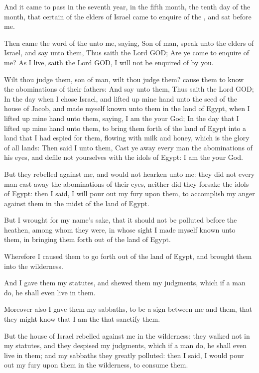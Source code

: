 \Chapter
\Verse And it came to pass in the seventh year, in the fifth month, the tenth day of the month, that certain of the elders of Israel came to enquire of the \LORD, and sat before me.

\Verse Then came the word of the \LORD unto me, saying, \Verse Son of man, speak unto the elders of Israel, and say unto them, Thus saith the Lord GOD; Are ye come to enquire of me? As I live, saith the Lord GOD, I will not be enquired of by you.

\Verse Wilt thou judge them, son of man, wilt thou judge them? cause them to know the abominations of their fathers: \Verse And say unto them, Thus saith the Lord GOD; In the day when I chose Israel, and lifted up mine hand unto the seed of the house of Jacob, and made myself known unto them in the land of Egypt, when I lifted up mine hand unto them, saying, I am the \LORD your God; \Verse In the day that I lifted up mine hand unto them, to bring them forth of the land of Egypt into a land that I had espied for them, flowing with milk and honey, which is the glory of all lands: \Verse Then said I unto them, Cast ye away every man the abominations of his eyes, and defile not yourselves with the idols of Egypt: I am the \LORD your God.

\Verse But they rebelled against me, and would not hearken unto me: they did not every man cast away the abominations of their eyes, neither did they forsake the idols of Egypt: then I said, I will pour out my fury upon them, to accomplish my anger against them in the midst of the land of Egypt.

\Verse But I wrought for my name's sake, that it should not be polluted before the heathen, among whom they were, in whose sight I made myself known unto them, in bringing them forth out of the land of Egypt.

\Verse Wherefore I caused them to go forth out of the land of Egypt, and brought them into the wilderness.

\Verse And I gave them my statutes, and shewed them my judgments, which if a man do, he shall even live in them.

\Verse Moreover also I gave them my sabbaths, to be a sign between me and them, that they might know that I am the \LORD that sanctify them.

\Verse But the house of Israel rebelled against me in the wilderness: they walked not in my statutes, and they despised my judgments, which if a man do, he shall even live in them; and my sabbaths they greatly polluted: then I said, I would pour out my fury upon them in the wilderness, to consume them.

